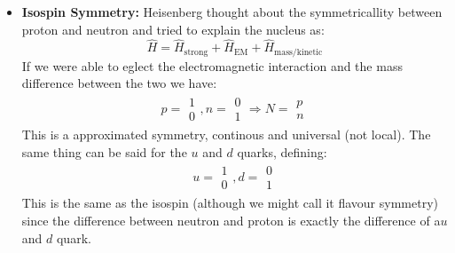 \documentclass[10pt,a4paper]{article}
\newcommand{\ket}[1]{\left\vert #1 \right\rangle}
\begin{document}
\begin{itemize}
\begin{align}
\begin{matrix}
                         \hat L_x \\
                         \hat L_y \\ 
                         \hat L_z 
                    \end{matrix}\right.\\
                    [\hat L_i, \hat L_j] &= i\epsilon_{ijk}\hat L_k\\
                    \hat L^2 &= \hat L_x^2 +\hat L_y^2 +\hat L_z^2\\
                    [\hat L^2 , \hat L_i] &= 0\\
                    \hat L^2 , \hat L_z &\rightarrow\text{Same eingenvalues: } \ \ \ket{\ell , m}\\
                    \hat L_z \ket{\ell, m} &= m\ket{\ell, m}\\
                    \hat L^2 \ket{\ell, m} &= \ell(\ell+1)\ket{\ell,m}\\
                    \hat{L_\pm} &= \hat L_x \pm i \hat L_y\\
                    \hat{L_\pm} \ket{\ell, m} &= \sqrt{\ell(\ell+1) - m (m\mp 1  )}\ket{\ell ,m\pm 1}
               \end{align}
               \item\textbf{Isospin Symmetry:} Heisenberg thought about the symmetricallity between proton and neutron and tried to explain the nucleus as:
               \begin{equation}
                    \hat H = \hat H_{\text{strong}} + \hat H_{\text{EM}} + \hat H_{\text{mass/kinetic}}
               \end{equation}
               If we were able to eglect the electromagnetic interaction and the mass difference between the two we have:
               \begin{align}
                    p = \begin{matrix}1\\0\end{matrix}, n = \begin{matrix}0\\1\end{matrix}\Rightarrow N = \begin{matrix}p\\n\end{matrix}
               \end{align}
               This is a approximated symmetry, continous and universal (not local). The same thing can be said for the $u$ and $d$ quarks, defining:
               \begin{align}
                    u = \begin{matrix}1\\0\end{matrix}, d = \begin{matrix}0\\1\end{matrix}
               \end{align}
               This is the same as the isospin (although we might call it flavour symmetry) since the difference between neutron and proton is exactly the difference of a$u$ and $d$ quark.
          \end{itemize}
\end{document}
